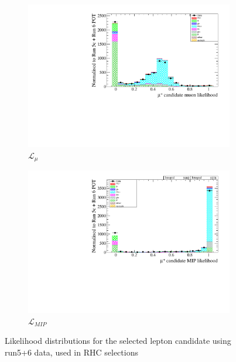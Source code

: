 \begin{figure}[!h]
	\begin{subfigure}[t]{0.49\textwidth}
		\includegraphics[width=\textwidth]{figures/numu/Cuts/numubar/selmu_likemu_particle}
		\caption{$\mathcal{L}_\mu$}
	\end{subfigure}
	\begin{subfigure}[t]{0.49\textwidth}
		\includegraphics[width=\textwidth]{figures/numu/Cuts/numubar/selmu_likemip_particle}
		\caption{$\mathcal{L}_{MIP}$}
	\end{subfigure}
	\caption{Likelihood distributions for the selected lepton candidate using run5+6 \numubar data, used in \numubar RHC selections}
	\label{fig:numubar_likelihood_sel}
\end{figure}

